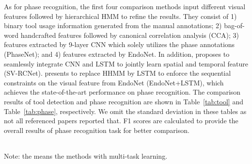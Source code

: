 \documentclass{elsarticle}
\begin{document}
As for phase recognition, the first four comparison methods input different visual features followed by hierarchical HMM to refine the results.
They consist of 1) binary tool usage information generated from the manual annotations;
2) bag-of-word handcrafted features followed by canonical correlation analysis (CCA);
3) features extracted by 9-layer CNN which solely utilizes the phase annotations (PhaseNet); and
4) features extracted by EndoNet.
In addition, \cite{jin2018sv} proposes to seamlessly integrate CNN and LSTM to jointly learn spatial and temporal feature (SV-RCNet).
\cite{twinanda2017vision} presents to replace HHMM by LSTM to enforce the sequential constraints on the visual feature from EndoNet (EndoNet+LSTM), which achieves the state-of-the-art performance on phase recognition.
The comparison results of tool detection and phase recognition are shown in Table~\ref{tab:tool} and Table~\ref{tab:phase}, respectively.
We omit the standard deviation in these tables as not all referenced papers reported that.
F1 scores are calculated to provide the overall results of phase recognition task for better comparison.


\begin{table}[t]
\centering
	\caption{Average precisions for recognizing the seven tools (rows) using different approaches (2nd to 5th columns).}
	\vspace{-2mm}
	\label{tab:tool}
		\\
		\vspace{0.5mm}
		\scriptsize Note: the  means the methods with multi-task learning.	~~~~~~~~			
\end{table}
	
\end{document}
